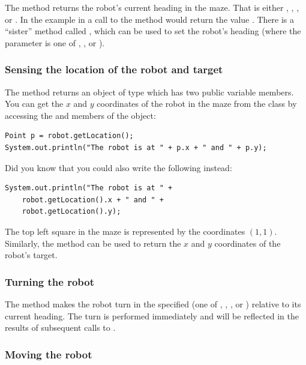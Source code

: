 The method  returns the robot's current heading in the maze. That is either , , , or 
. In the example in  a call to the method  would return the value . There is a ``sister'' method called , which can be used to set the robot's heading (where the parameter  is 
one of , ,  or ).

\subsubsection{Sensing the location of the robot and target}

The method  returns an object of type  which has two public variable members. You can get the $x$ and $y$ coordinates of the robot in the maze from
the  class by accessing the  and  members of the object:
\begin{verbatim}
Point p = robot.getLocation();
System.out.println("The robot is at " + p.x + " and " + p.y);
\end{verbatim}
Did you know that you could also write the following instead:
\begin{verbatim}
System.out.println("The robot is at " + 
    robot.getLocation().x + " and " + 
    robot.getLocation().y);
\end{verbatim}
The top left square in the maze is represented by the coordinates $(1,1)$. Similarly, the method  can be used to return the $x$ and $y$ coordinates of the robot's target.

\subsubsection{Turning the robot}

The method  makes the robot turn in the specified  (one of , , , or ) relative to its current heading.  
The turn is performed immediately and will be reflected in the results of subsequent calls to .

\subsubsection{Moving the robot}

